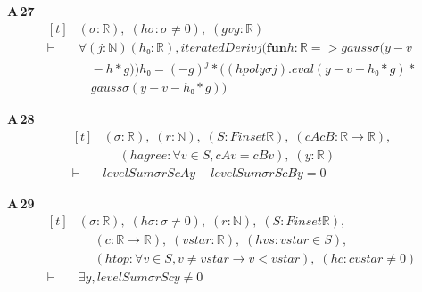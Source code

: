 \noindent\textbf{A\,27}\quad{}
{\footnotesize\[ \begin{aligned}[t]
&(\sigma : \mathbb{R} ),\; (\mathit{hσ} : \sigma \neq 0),\; (\mathit{g} \mathit{v} \mathit{y} : \mathbb{R} )\\
\vdash\;&\forall (\mathit{j} : \mathbb{N} ) (\mathit{h₀} : \mathbb{R} ), \mathit{iteratedDeriv} \mathit{j} (\mathbf{fun} \mathit{h} : \mathbb{R} => \mathit{gauss} \sigma (\mathit{y} - \mathit{v}\\
&\quad - \mathit{h} * \mathit{g})) \mathit{h₀} = (-\mathit{g}) ^{\mathit{j}} * ((\mathit{hpoly} \sigma \mathit{j}).\mathit{eval} (\mathit{y} - \mathit{v} - \mathit{h₀} * \mathit{g}) *\\
&\quad \mathit{gauss} \sigma (\mathit{y} - \mathit{v} - \mathit{h₀} * \mathit{g}))
\end{aligned} \]}

\noindent\textbf{A\,28}\quad{}
{\footnotesize\[ \begin{aligned}[t]
&(\sigma : \mathbb{R} ),\; (\mathit{r} : \mathbb{N} ),\; (\mathit{S} : \mathit{Finset} \mathbb{R} ),\; (\mathit{cA} \mathit{cB} : \mathbb{R} \to \mathbb{R} ),\\
&\quad \; (\mathit{hagree} : \forall \mathit{v} \in \mathit{S}, \mathit{cA} \mathit{v} = \mathit{cB} \mathit{v}),\; (\mathit{y} : \mathbb{R} )\\
\vdash\;&\mathit{levelSum} \sigma \mathit{r} \mathit{S} \mathit{cA} \mathit{y} - \mathit{levelSum} \sigma \mathit{r} \mathit{S} \mathit{cB} \mathit{y} = 0
\end{aligned} \]}

\noindent\textbf{A\,29}\quad{}
{\footnotesize\[ \begin{aligned}[t]
&(\sigma : \mathbb{R} ),\; (\mathit{hσ} : \sigma \neq 0),\; (\mathit{r} : \mathbb{N} ),\; (\mathit{S} : \mathit{Finset} \mathbb{R} ),\\
&\quad \; (\mathit{c} : \mathbb{R} \to \mathbb{R} ),\; (\mathit{vstar} : \mathbb{R} ),\; (\mathit{hvs} : \mathit{vstar} \in \mathit{S}),\\
&\quad \; (\mathit{htop} : \forall \mathit{v} \in \mathit{S}, \mathit{v} \neq \mathit{vstar} \to \mathit{v} < \mathit{vstar}),\; (\mathit{hc} : \mathit{c} \mathit{vstar} \neq 0)\\
\vdash\;&\exists \mathit{y}, \mathit{levelSum} \sigma \mathit{r} \mathit{S} \mathit{c} \mathit{y} \neq 0
\end{aligned} \]}

